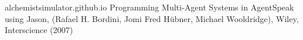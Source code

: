 \documentclass[12pt,a4paper,openright,twoside]{report}
\begin{document}
\begin{thebibliography}{90} %
\rhead[\fancyplain{}{\bfseries \leftmark}]{\fancyplain{}{\bfseries \thepage}}

 alchemistsimulator.github.io
 Programming Multi-Agent Systems in AgentSpeak using Jason, (Rafael H. Bordini, Jomi Fred H\"{u}bner, Michael Wooldridge), Wiley, Interscience (2007)

\end{thebibliography}
\end{document}
